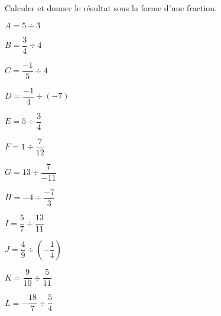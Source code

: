 \begin{exercice*}
    Calculer et donner le résultat sous la forme d'une fraction.
    \begin{multicols}{2}
        \begin{spacing}{2}
            \begin{list}{}{}
                \item $A=5\div3$
                \item $B=\dfrac{3}{4}\div 4$
                \item $C=\dfrac{-1}{5}\div 4$
                \item $D=\dfrac{-1}{4}\div (-7)$
                \item $E=5\div\dfrac{3}{4}$
                \item $F=1\div\dfrac{7}{12}$
                \item $G=13\div\dfrac{7}{-11}$
                \item $H=-4\div\dfrac{-7}{3}$
                \item $I=\dfrac{5}{7}\div\dfrac{13}{11}$
                \item $J=\dfrac{4}{9}\div\left(-\dfrac{1}{4}\right)$
                \item $K=\dfrac{9}{10}\div\dfrac{5}{11}$
                \item $L=-\dfrac{18}{7}\div\dfrac{5}{4}$
            \end{list}
        \end{spacing}
    \end{multicols}
\end{exercice*}
